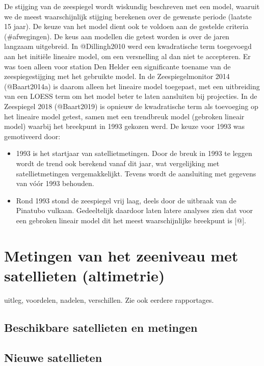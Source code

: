 \documentclass[ddraft]{deltares_report}
\begin{document}
De stijging van de zeespiegel wordt wiskundig beschreven met een model,
waaruit we de meest waarschijnlijk stijging berekenen over de gewenste
periode (laatste 15 jaar). De keuze van het model dient ook te voldoen
aan de gestelde criteria (\#afwegingen). De keus aan modellen die getest
worden is over de jaren langzaam uitgebreid. In @Dillingh2010 werd een
kwadratische term toegevoegd aan het initiële lineaire model, om een
versnelling al dan niet te accepteren. Er was toen alleen voor station
Den Helder een significante toename van de zeespiegestijging met het
gebruikte model. In de Zeespiegelmonitor 2014 (@Baart2014a) is daarom
alleen het lineaire model toegepast, met een uitbreiding van een LOESS
term om het model beter te laten aansluiten bij projecties. In de
Zeespiegel 2018 (@Baart2019) is opnieuw de kwadratische term als
toevoeging op het lineaire model getest, samen met een trendbreuk model
(gebroken lineair model) waarbij het breekpunt in 1993 gekozen werd. De
keuze voor 1993 was gemotiveerd door:

\begin{itemize}
\tightlist
\item
  1993 is het startjaar van satellietmetingen. Door de breuk in 1993 te
  leggen wordt de trend ook berekend vanaf dit jaar, wat vergelijking
  met satellietmetingen vergemakkelijkt. Tevens wordt de aansluiting met
  gegevens van vóór 1993 behouden.
\item
  Rond 1993 stond de zeespiegel vrij laag, deels door de uitbraak van de
  Pinatubo vulkaan. Gedeeltelijk daardoor laten latere analyses zien dat
  voor een gebroken lineair model dit het meest waarschijnlijke
  breekpunt is {[}@{]}.
\end{itemize}

\section{Metingen van het zeeniveau met satellieten
(altimetrie)}\label{altimetrie}

uitleg, voordelen, nadelen, verschillen. Zie ook eerdere rapportages.

\subsection{Beschikbare satellieten en
metingen}\label{beschikbare-satellieten-en-metingen}

\subsection{Nieuwe satellieten}\label{nieuwe-satellieten}
\end{document}
